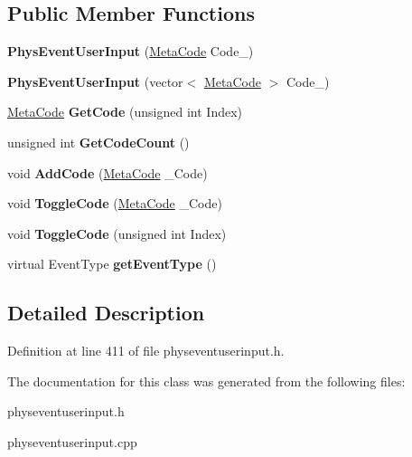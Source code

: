 \subsection*{Public Member Functions}
\begin{DoxyCompactItemize}
\item 
\hypertarget{classPhysEventUserInput_a218bec21fe49efcba82f3480e2386968}{
{\bfseries PhysEventUserInput} (\hyperlink{classMetaCode}{MetaCode} Code\_\-)}
\label{dc/d0e/classPhysEventUserInput_a218bec21fe49efcba82f3480e2386968}

\item 
\hypertarget{classPhysEventUserInput_ab9451ee5b385a3c575922ec7cfa07747}{
{\bfseries PhysEventUserInput} (vector$<$ \hyperlink{classMetaCode}{MetaCode} $>$ Code\_\-)}
\label{dc/d0e/classPhysEventUserInput_ab9451ee5b385a3c575922ec7cfa07747}

\item 
\hypertarget{classPhysEventUserInput_a590b347fcd5db7a48fc460b1ed538e4f}{
\hyperlink{classMetaCode}{MetaCode} {\bfseries GetCode} (unsigned int Index)}
\label{dc/d0e/classPhysEventUserInput_a590b347fcd5db7a48fc460b1ed538e4f}

\item 
\hypertarget{classPhysEventUserInput_a8232572283b9dc85c96a2b28479123a8}{
unsigned int {\bfseries GetCodeCount} ()}
\label{dc/d0e/classPhysEventUserInput_a8232572283b9dc85c96a2b28479123a8}

\item 
\hypertarget{classPhysEventUserInput_a2b30cdf2aedb70940b85bb9e4665230f}{
void {\bfseries AddCode} (\hyperlink{classMetaCode}{MetaCode} \_\-Code)}
\label{dc/d0e/classPhysEventUserInput_a2b30cdf2aedb70940b85bb9e4665230f}

\item 
\hypertarget{classPhysEventUserInput_a4d95c43110ac7023c5da208c14db565f}{
void {\bfseries ToggleCode} (\hyperlink{classMetaCode}{MetaCode} \_\-Code)}
\label{dc/d0e/classPhysEventUserInput_a4d95c43110ac7023c5da208c14db565f}

\item 
\hypertarget{classPhysEventUserInput_a1bf30bbab980fd0beee52509bdb4a2ad}{
void {\bfseries ToggleCode} (unsigned int Index)}
\label{dc/d0e/classPhysEventUserInput_a1bf30bbab980fd0beee52509bdb4a2ad}

\item 
\hypertarget{classPhysEventUserInput_a7adabb15e8012a86c9da1910033eea4b}{
virtual EventType {\bfseries getEventType} ()}
\label{dc/d0e/classPhysEventUserInput_a7adabb15e8012a86c9da1910033eea4b}

\end{DoxyCompactItemize}


\subsection{Detailed Description}


Definition at line 411 of file physeventuserinput.h.

The documentation for this class was generated from the following files:\begin{DoxyCompactItemize}
\item 
physeventuserinput.h\item 
physeventuserinput.cpp\end{DoxyCompactItemize}

